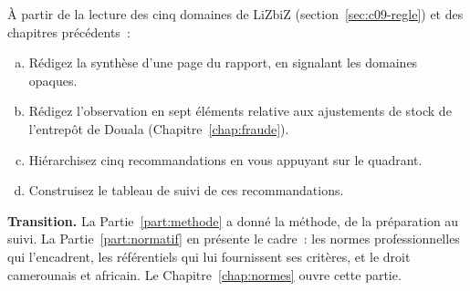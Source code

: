 \begin{boxexo}[title={\ding{45}\quad Exercice~9.3. Le rapport d'AUDIX CONSEIL \niveauexpert}]
À partir de la lecture des cinq domaines de LiZbiZ
(section~\ref{sec:c09-regle}) et des chapitres précédents~:
\begin{enumerate}[(a)]
    \item Rédigez la synthèse d'une page du rapport, en signalant les
          domaines opaques.
    \item Rédigez l'observation en sept éléments relative aux ajustements de
          stock de l'entrepôt de Douala (Chapitre~\ref{chap:fraude}).
    \item Hiérarchisez cinq recommandations en vous appuyant sur le quadrant.
    \item Construisez le tableau de suivi de ces recommandations.
\end{enumerate}
\end{boxexo}

\bigskip

\begin{boxinfo}
\textbf{Transition.} La Partie~\ref{part:methode} a donné la méthode, de la
préparation au suivi. La Partie~\ref{part:normatif} en présente le cadre~:
les normes professionnelles qui l'encadrent, les référentiels qui lui
fournissent ses critères, et le droit camerounais et africain. Le
Chapitre~\ref{chap:normes} ouvre cette partie.
\end{boxinfo}

